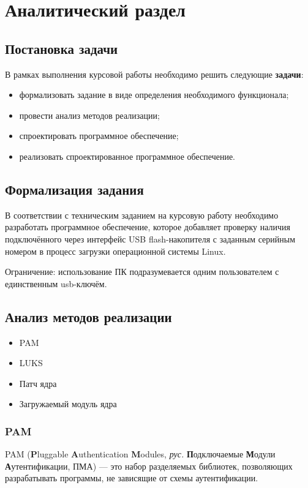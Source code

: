 \chapter{Аналитический раздел}

\section{Постановка задачи}

В рамках выполнения курсовой работы необходимо решить следующие \textbf{задачи}:
\begin{itemize}
	\item формализовать задание в виде определения необходимого функционала;
	\item провести анализ методов реализации;
	\item спроектировать программное обеспечение;
	\item реализовать спроектированное программное обеспечение.
\end{itemize}

\section{Формализация задания}

В соответствии с техническим заданием на курсовую работу необходимо разработать программное обеспечение, которое добавляет проверку наличия подключённого через интерфейс USB flash-накопителя с заданным серийным номером в процесс загрузки операционной системы Linux.

Ограничение: использование ПК подразумевается одним пользователем с единственным usb-ключём.

\section{Анализ методов реализации}

\begin{itemize}
	\item PAM
	\item LUKS
	\item Патч ядра
	\item Загружаемый модуль ядра
\end{itemize}

\subsection{PAM}

PAM (\textbf{P}luggable \textbf{A}uthentication \textbf{M}odules, \textit{рус.} \textbf{П}одключаемые \textbf{М}одули \textbf{А}утентификации, ПМА) — это набор разделяемых библиотек, позволяющих разрабатывать программы, не зависящие от схемы аутентификации.

